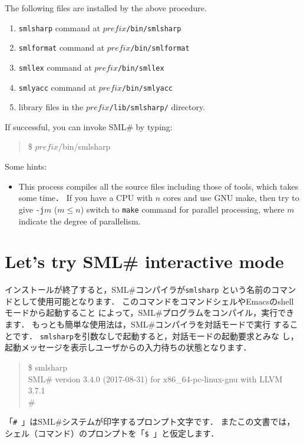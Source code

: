 \documentclass{jbook}
\newcommand{\txt}[2]{#2}
\newcommand{\smlsharp}{SML\#}
\newcommand{\version}{3.4.0}
\newcommand{\releaseDate}{2017-08-31}
\newenvironment{program}{\begin{quote}\begin{tt}}%
                        {\end{tt}\end{quote}}
\begin{document}
	The following files are installed by the above procedure.
\begin{enumerate}
\item {\tt smlsharp} command at {\tt $\mathit{prefix}$/bin/smlsharp}
\item {\tt smlformat} command at {\tt $\mathit{prefix}$/bin/smlformat}
\item {\tt smllex} command at {\tt $\mathit{prefix}$/bin/smllex}
\item {\tt smlyacc} command at {\tt $\mathit{prefix}$/bin/smlyacc}
\item library files in the {\tt $\mathit{prefix}$/lib/smlsharp/} directory.
\end{enumerate}
	If successful, you can invoke \smlsharp{} by typing:
\begin{program}
\$ $\mathit{prefix}$/bin/smlsharp
\end{program}

Some hints:
\begin{itemize}
\item 
	This process compiles all the source files including those of
tools, which takes some time．
	If you have a CPU with $n$ cores and use GNU make, then try to
give {\tt -j$m$} ($m \le n$) switch to {\tt make} command for
parallel processing, where $m$ indicate the degree of parallelism. 
\end{itemize}
\fi%

\section{
\txt{\smlsharp{}の対話型モードを使ってみよう}
    {Let's try \smlsharp{} interactive mode}}
\label{sec:tutorialInteractive}

\ifjp%

	インストールが終了すると，\smlsharp{}コンパイラが{\tt smlsharp}
という名前のコマンドとして使用可能となります．
	このコマンドをコマンドシェルやEmacsのshellモードから起動すること
によって，\smlsharp{}プログラムをコンパイル，実行できます．
	もっとも簡単な使用法は，\smlsharp{}コンパイラを対話モードで実行
することです．
	{\tt smlsharp}を引数なしで起動すると，対話モードの起動要求とみな
し，起動メッセージを表示しユーザからの入力待ちの状態となります．
\begin{tt}
\begin{quote}
\$ smlsharp\\
SML\# version \version{} (\releaseDate{}) for x86\_64-pc-linux-gnu with LLVM 3.7.1\\
\# 
\end{quote}
\end{tt}
	「{\tt \#\ }」は\smlsharp{}システムが印字するプロンプト文字です． 
	またこの文書では，シェル（コマンド）のプロンプトを「{\tt \$\ }」と仮定します．
\end{document}
